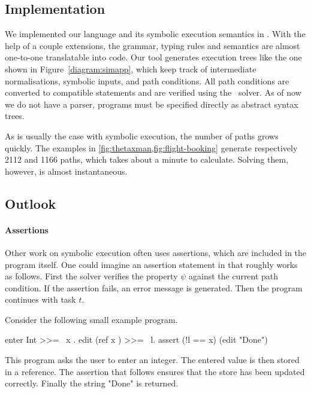 \subsection{Implementation}

We implemented our language and its symbolic execution semantics in \HASKELL.
With the help of a couple \GHC extensions, the grammar, typing rules and semantics are almost one-to-one translatable into code.
Our tool generates execution trees like the one shown in Figure~\ref{diagram:simapp},
which keep track of intermediate normalisations, symbolic inputs, and path conditions.
All path conditions are converted to \SMTLIB compatible statements and are verified using the \ZTHREE \SMT~solver.
As of now we do not have a parser, programs must be specified directly as abstract syntax trees.

As is usually the case with symbolic execution, the number of paths grows quickly.
The examples in \cref{fig:thetaxman,fig:flight-booking} generate respectively 2112 and 1166 paths,
which takes about a minute to calculate.
Solving them, however, is almost instantaneous.



\subsection{Outlook}
\label{subsec:outlook}

\paragraph{Assertions}

Other work on symbolic execution often uses assertions, which are included in the program itself.
One could imagine an assertion statement  in \TOPHAT that roughly works as follows.
First the \SAT solver verifies the property $\psi$ against the current path condition.
If the assertion fails, an error message is generated.
Then the program continues with task $t$.

\begin{example}
  Consider the following small example program.
  \begin{TASK}
    enter Int >>= \ x . edit (ref x ) >>= \ l. assert (!l == x) (edit "Done")
  \end{TASK}

  This program asks the user to enter an integer.
  The entered value is then stored in a reference.
  The assertion that follows ensures that the store has been updated correctly.
  Finally the string "Done" is returned.
\end{example}

